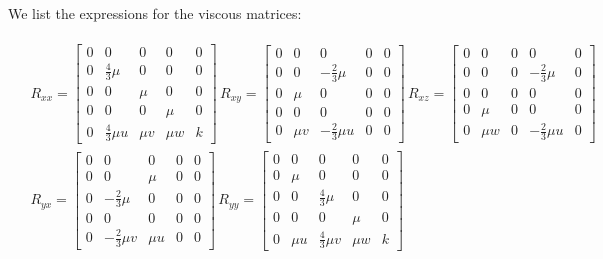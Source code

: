 \documentclass[12pt, letterpaper]{report}
\begin{document}
We list the expressions for the viscous matrices:

\begin{align}\label{eqVisMat}
   \begin{split}
      &R_{xx} = \begin{bmatrix}
         0 & 0 & 0 & 0 & 0 \\
         0 & \frac{4}{3}\mu & 0 & 0 & 0 \\
         0 & 0 & \mu & 0 & 0 \\
         0 & 0 & 0 & \mu & 0 \\
         0 & \frac{4}{3}\mu u & \mu v & \mu w & k
      \end{bmatrix} \,
      R_{xy} = \begin{bmatrix}
         0 & 0 & 0 & 0 & 0 \\
         0 & 0 & -\frac{2}{3}\mu & 0 & 0 \\
         0 & \mu & 0 & 0 & 0 \\
         0 & 0 & 0 & 0 & 0 \\
         0 & \mu v & -\frac{2}{3}\mu u & 0 & 0
      \end{bmatrix} \,
      R_{xz} = \begin{bmatrix}
         0 & 0 & 0 & 0 & 0 \\
         0 & 0 & 0 & -\frac{2}{3}\mu & 0 \\
         0 & 0 & 0 & 0 & 0 \\
         0 & \mu & 0 & 0 & 0 \\
         0 & \mu w & 0 & -\frac{2}{3}\mu u& 0
      \end{bmatrix} \\[10pt]
      &R_{yx} = \begin{bmatrix}
         0 & 0 & 0 & 0 & 0 \\
         0 & 0 & \mu & 0 & 0 \\
         0 & -\frac{2}{3}\mu & 0 & 0 & 0 \\
         0 & 0 & 0 & 0 & 0 \\
         0 & -\frac{2}{3}\mu v & \mu u & 0 & 0
      \end{bmatrix} \,
      R_{yy} = \begin{bmatrix}
         0 & 0 & 0 & 0 & 0 \\
         0 & \mu & 0 & 0 & 0 \\
         0 & 0 & \frac{4}{3}\mu & 0 & 0 \\
         0 & 0 & 0 & \mu & 0 \\
         0 & \mu u & \frac{4}{3}\mu v & \mu w & k
      \end{bmatrix} \,

\end{split}
\end{align}
\end{document}
